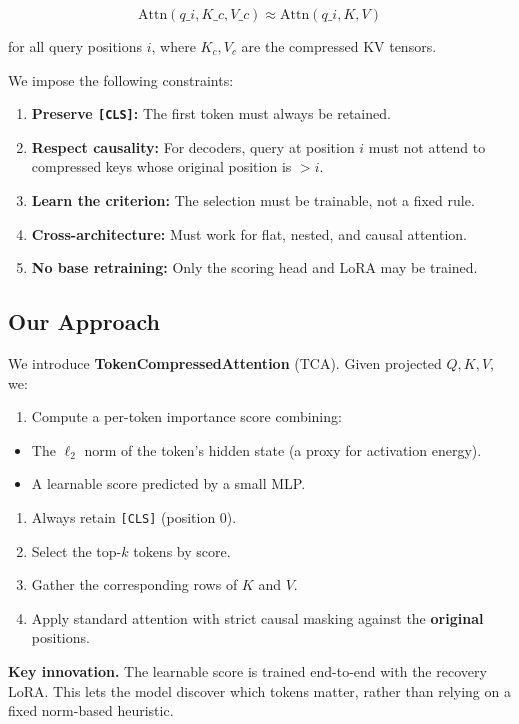 \[
\text{Attn}(q\_i, K\_c, V\_c) \approx \text{Attn}(q\_i, K, V)
\tag{1.1}
\]

for all query positions $i$, where $K_c, V_c$ are the compressed KV tensors.

We impose the following constraints:

\begin{enumerate}
\item \textbf{Preserve \texttt{[CLS]}:} The first token must always be retained.
\item \textbf{Respect causality:} For decoders, query at position $i$ must not attend
  to compressed keys whose original position is $> i$.
\item \textbf{Learn the criterion:} The selection must be trainable, not a fixed rule.
\item \textbf{Cross-architecture:} Must work for flat, nested, and causal attention.
\item \textbf{No base retraining:} Only the scoring head and LoRA may be trained.

\end{enumerate}
\subsection{Our Approach}

We introduce \textbf{TokenCompressedAttention} (TCA). Given projected $Q, K, V$, we:

\begin{enumerate}
\item Compute a per-token importance score combining:
\end{enumerate}
\begin{itemize}
\item The $\ell_2$ norm of the token's hidden state (a proxy for activation energy).
\item A learnable score predicted by a small MLP.
\end{itemize}
\begin{enumerate}
\item Always retain \texttt{[CLS]} (position 0).
\item Select the top-$k$ tokens by score.
\item Gather the corresponding rows of $K$ and $V$.
\item Apply standard attention with strict causal masking against the \textbf{original} positions.

\end{enumerate}
\textbf{Key innovation.} The learnable score is trained end-to-end with the recovery 
LoRA. This lets the model discover which tokens matter, rather than relying 
on a fixed norm-based heuristic.


